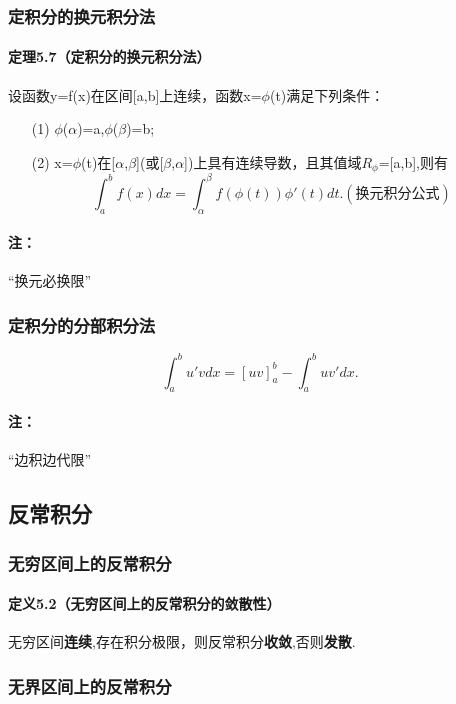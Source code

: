 \documentclass[12pt, a4paper, oneside]{ctexart}
\begin{document}
\subsubsection{定积分的换元积分法}
\paragraph{定理5.7（定积分的换元积分法）}设函数y=f(x)在区间[a,b]上连续，函数x=$\phi $(t)满足下列条件：
\begin{enumerate}
	\item[(1)]$\phi $($\alpha$)=a,$\phi $($\beta $)=b;
	\item[(2)]x=$\phi$(t)在[$\alpha $,$\beta $](或[$\beta $,$\alpha $])上具有连续导数，且其值域$R_{\phi }^{}$=[a,b],则有
	\begin{equation}
		\int_{a}^{b}f(x)dx=\int_{\alpha}^{\beta}f(\phi (t))\phi '(t)dt.(\textbf{换元积分公式})
	\end{equation} 
\end{enumerate}
\paragraph{注：}“换元必换限”

\subsubsection{定积分的分部积分法}
\begin{equation}
	\int _{a}^{b}u'vdx=[uv]_{a}^{b}-\int _{a}^{b}uv'dx.
\end{equation}
\paragraph{注：}“边积边代限”

\vskip 1cm
\subsection{反常积分}
\subsubsection{无穷区间上的反常积分}
\paragraph{定义5.2（无穷区间上的反常积分的敛散性）}无穷区间\textbf{连续},存在积分极限，则反常积分\textbf{收敛},否则\textbf{发散}.
\subsubsection{无界区间上的反常积分}
\end{document}
